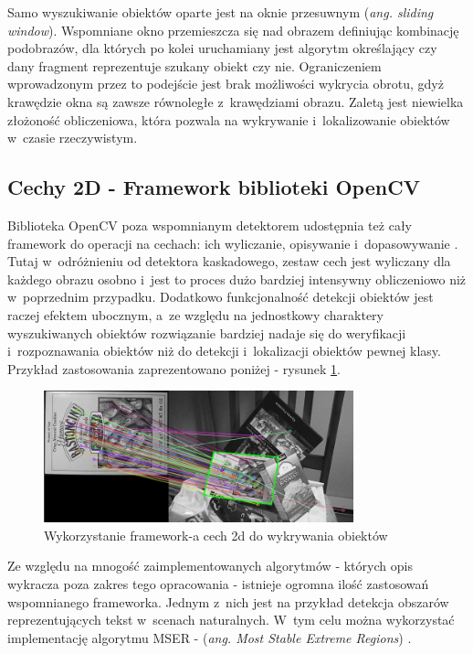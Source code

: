 Samo wyszukiwanie obiektów oparte jest na oknie przesuwnym
(\textit{ang. sliding window}). Wspomniane okno przemieszcza się nad
obrazem definiując kombinację podobrazów, dla których po kolei uruchamiany
jest algorytm określający czy dany fragment reprezentuje szukany obiekt czy
nie. Ograniczeniem wprowadzonym przez to podejście jest brak możliwości
wykrycia obrotu, gdyż krawędzie okna są zawsze równoległe z~krawędziami
obrazu. Zaletą jest niewielka złożoność obliczeniowa, która pozwala
na wykrywanie i~lokalizowanie obiektów w~czasie rzeczywistym.

\subsection{Cechy 2D - Framework biblioteki OpenCV}

Biblioteka OpenCV poza wspomnianym detektorem udostępnia też cały
framework do operacji na cechach: ich wyliczanie, opisywanie 
i~dopasowywanie \cite{OCV:feture2dframework}.
Tutaj w~odróżnieniu od detektora kaskadowego, zestaw cech
jest wyliczany dla każdego obrazu osobno i~jest to proces dużo bardziej
intensywny obliczeniowo niż w~poprzednim przypadku. Dodatkowo
funkcjonalność detekcji obiektów jest raczej efektem ubocznym,
a~ze względu na jednostkowy charaktery wyszukiwanych obiektów rozwiązanie
bardziej nadaje się do weryfikacji i~rozpoznawania obiektów niż do
detekcji i~lokalizacji obiektów pewnej klasy. Przykład zastosowania 
zaprezentowano poniżej - rysunek \ref{fig:rev_features2d_detection}.

\begin{figure}[h!]
  \centering
    \includegraphics[width=0.8\textwidth]{img/rev_features2d_detection}
  \caption{Wykorzystanie framework-a cech 2d do wykrywania obiektów}
  \label{fig:rev_features2d_detection}
\end{figure}

Ze względu na mnogość zaimplementowanych algorytmów - których opis
wykracza poza zakres tego opracowania - istnieje ogromna ilość
zastosowań wspomnianego frameworka. Jednym z~nich jest na przykład
detekcja obszarów
reprezentujących tekst w~scenach naturalnych. W~tym celu
można wykorzystać implementację algorytmu MSER - (\textit{ang. Most
Stable Extreme Regions}) \cite{OCV:MSER}.

